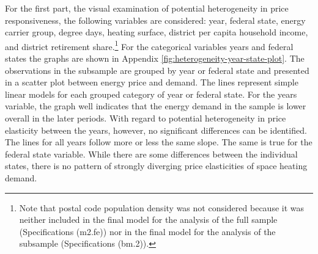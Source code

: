 \documentclass[12pt,twoside]{reedthesis}
\begin{document}
For the first part, the visual examination of potential heterogeneity in price responsiveness, the following variables are considered: year, federal state, energy carrier group, degree days, heating surface, district per capita household income, and district retirement share.\footnote{Note that postal code population density was not considered because it was neither included in the final model for the analysis of the full sample (Specifications (m2.fe)) nor in the final model for the analysis of the subsample (Specifications (bm.2)).} For the categorical variables years and federal states the graphs are shown in Appendix \ref{fig:heterogeneity-year-state-plot}. The observations in the subsample are grouped by year or federal state and presented in a scatter plot between energy price and demand. The lines represent simple linear models for each grouped category of year or federal state. For the years variable, the graph well indicates that the energy demand in the sample is lower overall in the later periods. With regard to potential heterogeneity in price elasticity between the years, however, no significant differences can be identified. The lines for all years follow more or less the same slope. The same is true for the federal state variable. While there are some differences between the individual states, there is no pattern of strongly diverging price elasticities of space heating demand.
\end{document}
